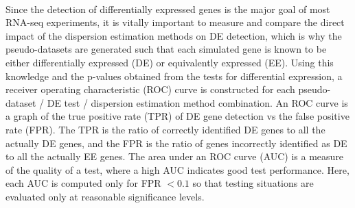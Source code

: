 \documentclass[10pt]{article}
\begin{document}
\paragraph{} \indent Since the detection of differentially expressed genes is the major goal of most RNA-seq experiments, it is vitally important to measure and compare the direct impact of the dispersion estimation methods on DE detection, which is why the pseudo-datasets are generated such that each simulated gene is known to be either differentially expressed (DE) or equivalently expressed (EE). Using this knowledge and the p-values obtained from the tests for differential expression, a receiver operating characteristic (ROC) curve is constructed for each pseudo-dataset / DE test / dispersion estimation method combination. An ROC curve is a graph of the true positive rate (TPR) of DE gene detection vs the false positive rate (FPR). The TPR is the ratio of correctly identified DE genes to all the actually DE genes, and the FPR is the ratio of genes incorrectly identified as DE to all the actually EE genes. The area under an ROC curve (AUC) is a measure of the quality of a test, where a high AUC indicates good test performance. Here, each AUC is computed only for FPR $< 0.1$ so that testing situations are evaluated only at reasonable significance levels.
\end{document}
